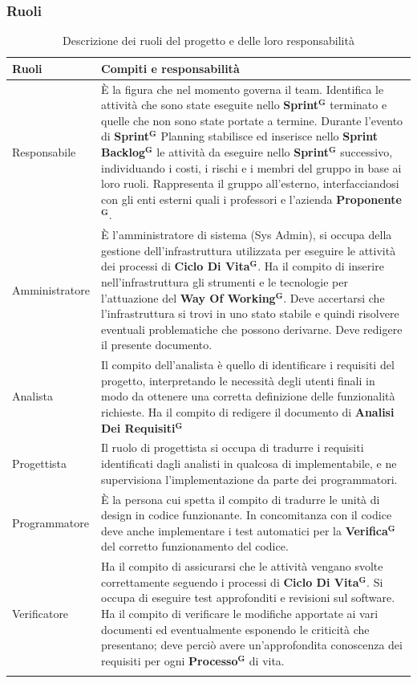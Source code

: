 \documentclass[a4paper,12pt]{article}
\newcommand{\term}[1]{\textbf{#1}$^\mathbf{G}$}
\begin{document}
\subsubsection{Ruoli}
\begin{center}
\small
{} 
\begin{longtable}{| m{3cm} | m{} |}
\hline
\rowcolor{gray!60} 
{\centering \textbf{Ruoli}} &
{\centering \textbf{Compiti e responsabilità}} \\
\hline
\rowcolor{white}
\centering Responsabile & È la figura che nel momento governa il team. Identifica le attività che sono state eseguite nello \term{Sprint} terminato e quelle che non sono state portate a termine. Durante l'evento di \term{Sprint} Planning stabilisce ed inserisce nello \term{Sprint Backlog} le attività da eseguire nello \term{Sprint} successivo, individuando i costi, i rischi e i membri del gruppo in base ai loro ruoli. Rappresenta il gruppo all'esterno, interfacciandosi con gli enti esterni quali i professori e l'azienda \term{Proponente}.    \\
\hline
\rowcolor{gray!20}
\centering Amministratore & È l'amministratore di sistema (Sys Admin), si occupa della gestione dell'infrastruttura utilizzata per eseguire le attività dei processi di \term{Ciclo Di Vita}. Ha il compito di inserire nell'infrastruttura gli strumenti e le tecnologie per l'attuazione del \term{Way Of Working}. Deve accertarsi che l'infrastruttura si trovi in uno stato stabile e quindi risolvere eventuali problematiche che possono derivarne. Deve redigere il presente documento.\\
\hline
\rowcolor{white}
\centering Analista & Il compito dell'analista è quello di identificare i requisiti del progetto, interpretando le necessità degli utenti finali in modo da ottenere una corretta definizione delle funzionalità richieste. Ha il compito di redigere il documento di \term{Analisi Dei Requisiti} \\
\hline
\rowcolor{gray!20}
\centering Progettista & Il ruolo di progettista si occupa di tradurre i requisiti identificati dagli analisti in qualcosa di implementabile, e ne supervisiona l'implementazione da parte dei programmatori. \\
\hline
\rowcolor{white}
\centering Programmatore & È la persona cui spetta il compito di tradurre le unità di design in codice funzionante. In concomitanza con il codice deve anche implementare i test automatici per la \term{Verifica} del corretto funzionamento del codice.\\
\hline
\rowcolor{gray!20}
\centering Verificatore & Ha il compito di assicurarsi che le attività vengano svolte correttamente seguendo i processi di \term{Ciclo Di Vita}. Si occupa di eseguire test approfonditi e revisioni sul software. Ha il compito di verificare le modifiche apportate ai vari documenti ed eventualmente esponendo le criticità che presentano; deve perciò avere un'approfondita conoscenza dei requisiti per ogni \term{Processo} di vita.\\
\hline
\caption{Descrizione dei ruoli del progetto e delle loro responsabilità} \\
\end{longtable}
\end{center}
\end{document}
